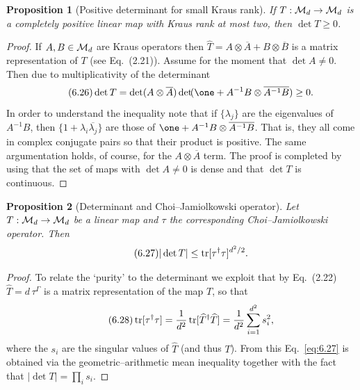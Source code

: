 \documentclass[11pt,a4paper]{article}
\theoremstyle{plain}
\newtheorem{proposition}{Proposition}[section]
\theoremstyle{definition}
\theoremstyle{remark}
\begin{document}
\begin{proposition}[Positive determinant for small Kraus rank]
    If $T:\mathcal{M}_d\to \mathcal{M}_d$ is a completely positive linear map with Kraus rank at most
    two, then $\det T\ge 0$.
\end{proposition}

\begin{proof}
    If $A,B\in\mathcal{M}_d$ are Kraus operators then
    $\widehat{T}=A\otimes \overline{A}+B\otimes \overline{B}$ is a matrix representation
    of $T$ (see Eq.~(2.21)). Assume for the moment that $\det A\neq 0$. Then due to
    multiplicativity of the determinant
    \begin{equation}\tag{6.26}\label{eq:6.26}
        \det T
        = \det(A\otimes \overline{A})
        \det\!(\one + A^{-1}B\otimes \overline{A^{-1}B})
        \ge 0.
    \end{equation}
    In order to understand the inequality note that if $\{\lambda_j\}$ are the eigenvalues
    of $A^{-1}B$, then $\{1+\lambda_i\overline{\lambda_j}\}$ are those of
    $\one + A^{-1}B\otimes \overline{A^{-1}B}$. That is, they all come in complex conjugate
    pairs so that their product is positive. The same argumentation holds, of course, for the
    $A\otimes \overline{A}$ term. The proof is completed by using that the set of maps with
    $\det A\neq 0$ is dense and that $\det T$ is continuous.
\end{proof}

\begin{proposition}[Determinant and Choi--Jamiolkowski operator]
    Let $T:\mathcal{M}_d\to \mathcal{M}_d$ be a linear map and $\tau$ the corresponding Choi--Jamiolkowski
    operator. Then
    \begin{equation}\tag{6.27}\label{eq:6.27}
        |\det T| \le \operatorname{tr}[\tau^\dagger \tau]^{d^2/2}.
    \end{equation}
\end{proposition}

\begin{proof}
    To relate the `purity' to the determinant we exploit that by Eq.~(2.22)
    $\widehat{T}=d\,\tau^\Gamma$ is a matrix representation of the map $T$, so that
    \begin{equation}\tag{6.28}\label{eq:6.28}
        \operatorname{tr}[\tau^\dagger \tau]
        = \frac{1}{d^2}\operatorname{tr}[\widehat{T}^\dagger \widehat{T}]
        = \frac{1}{d^2}\sum_{i=1}^{d^2} s_i^2,
    \end{equation}
    where the $s_i$ are the singular values of $\widehat{T}$ (and thus $T$). From this
    Eq.~\eqref{eq:6.27} is obtained via the geometric--arithmetic mean inequality together
    with the fact that $|\det T|=\prod_i s_i$.
\end{proof}
\end{document}
